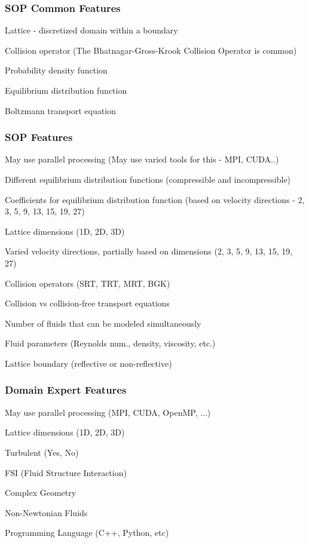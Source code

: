\documentclass[t,12pt,numbers,fleqn]{beamer}
\begin{document}


\begin{frame}
\frametitle{SOP Common Features}

\bi
	\item Lattice - discretized domain within a boundary
	\item Collision operator (The Bhatnagar-Gross-Krook Collision Operator is common)
	\item Probability density function
	\item Equilibrium distribution function
	\item Boltzmann transport equation
\ei

\end{frame}


\begin{frame}
\frametitle{SOP Features}

\bi
\item May use parallel processing (May use varied tools for this - MPI, CUDA..)
\item Different equilibrium distribution functions (compressible and incompressible)
\item Coefficients for equilibrium distribution function (based on velocity
  directions - 2, 3, 5, 9, 13, 15, 19, 27)
\item Lattice dimensions (1D, 2D, 3D)
\item Varied velocity directions, partially based on dimensions (2, 3, 5, 9, 13,
  15, 19, 27)
\item Collision operators (SRT, TRT, MRT, BGK)
\item Collision vs collision-free transport equations
\item Number of fluids that can be modeled simultaneously
\item Fluid parameters (Reynolds num., density, viscosity, etc.)
\item Lattice boundary (reflective or non-reflective)
\ei

\end{frame}


\begin{frame}
\frametitle{Domain Expert Features}

\bi
\item May use parallel processing (MPI, CUDA, OpenMP, ...)
\item Lattice dimensions (1D, 2D, 3D)
\item Turbulent (Yes, No)
\item FSI (Fluid Structure Interaction)
\item Complex Geometry
\item Non-Newtonian Fluids
\item Programming Language (C++, Python, etc)
\ei

\end{frame}
\end{document}
